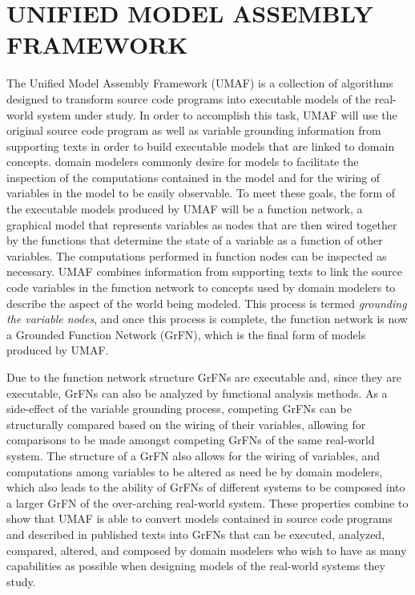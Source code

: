 \chapter{UNIFIED MODEL ASSEMBLY FRAMEWORK\label{chapter:umaf}}
The Unified Model Assembly Framework (UMAF) is a collection of algorithms designed to transform source code programs into executable models of the real-world system under study.
In order to accomplish this task, UMAF will use the original source code program as well as variable grounding information from supporting texts in order to build executable models that are linked to domain concepts.
domain modelers commonly desire for models to facilitate the inspection of the computations contained in the model and for the wiring of variables in the model to be easily observable.
To meet these goals, the form of the executable models produced by UMAF will be a function network, a graphical model that represents variables as nodes that are then wired together by the functions that determine the state of a variable as a function of other variables. The computations performed in function nodes can be inspected as necessary.
UMAF combines information from supporting texts to link the source code variables in the function network to concepts used by domain modelers to describe the aspect of the world being modeled.
This process is termed \textit{grounding the variable nodes}, and once this process is complete, the function network is now a Grounded Function Network (GrFN), which is the final form of models produced by UMAF.

Due to the function network structure GrFNs are executable and, since they are executable, GrFNs can also be analyzed by functional analysis methods.
As a side-effect of the variable grounding process, competing GrFNs can be structurally compared based on the wiring of their variables, allowing for comparisons to be made amongst competing GrFNs of the same real-world system.
The structure of a GrFN also allows for the wiring of variables, and computations among variables to be altered as need be by domain modelers, which also leads to the ability of GrFNs of different systems to be composed into a larger GrFN of the over-arching real-world system.
These properties combine to show that UMAF is able to convert models contained in source code programs and described in published texts into GrFNs that can be executed, analyzed, compared, altered, and composed by domain modelers who wish to have as many capabilities as possible when designing models of the real-world systems they study.

